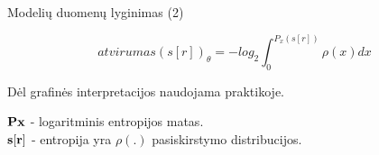 \begin{frame}[c]{Modelių duomenų lyginimas (2)}

\begin{equation}
    atvirumas(s[r])_{\theta} = -log_{2} \int_{0}^{P_{x}(s[r])} \rho(x)dx
\end{equation}

Dėl grafinės interpretacijos naudojama praktikoje.

$\bf Px$ - logaritminis entropijos matas. \\
$\bf s[r]$ - entropija yra $\rho(.)$ pasiskirstymo distribucijos.
 
\end{frame}